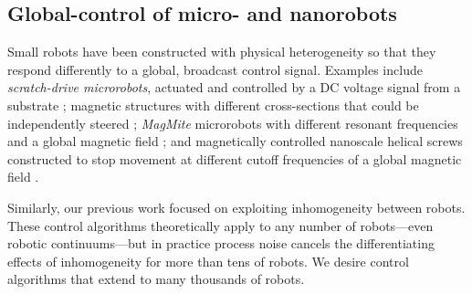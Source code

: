 \subsection{Global-control of micro- and nanorobots}
Small robots have been constructed with physical heterogeneity so that they respond differently to a global, broadcast control signal.  Examples include \emph{scratch-drive microrobots}, actuated and controlled by a DC voltage signal from a substrate \cite{Donald2008};   magnetic structures  with different cross-sections that could be independently steered \cite{Diller2013};   \emph{MagMite} microrobots with different resonant frequencies and a global magnetic field \cite{Frutiger2008}; and  magnetically controlled nanoscale helical screws constructed to stop movement at different cutoff frequencies of a global magnetic field
\cite{Peyer2013}. 


Similarly, our previous work \cite{Becker2012,Becker2012k} focused on exploiting inhomogeneity between robots.  These control algorithms theoretically apply to any number of robots---even robotic continuums---but in practice process noise cancels the differentiating effects of inhomogeneity for more than tens of robots.  We desire control algorithms that extend to many thousands of robots.

